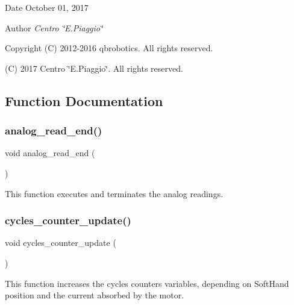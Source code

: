 \begin{DoxyDate}{Date}
October 01, 2017 
\end{DoxyDate}
\begin{DoxyAuthor}{Author}
{\itshape Centro \char`\"{}\+E.\+Piaggio\char`\"{}} 
\end{DoxyAuthor}
\begin{DoxyCopyright}{Copyright}
(C) 2012-\/2016 qbrobotics. All rights reserved. 

(C) 2017 Centro \char`\"{}\+E.\+Piaggio\char`\"{}. All rights reserved. 
\end{DoxyCopyright}


\subsection{Function Documentation}
\mbox{\label{interruptions_8c_a00a8d34962a63161405e5d7785b9625e}} 
\subsubsection{analog\+\_\+read\+\_\+end()}
{\footnotesize\ttfamily void analog\+\_\+read\+\_\+end (\begin{DoxyParamCaption}{ }\end{DoxyParamCaption})}

This function executes and terminates the analog readings. \mbox{\label{interruptions_8c_a77877c16b42f6f384f7c80d3002aed22}} 
\subsubsection{cycles\+\_\+counter\+\_\+update()}
{\footnotesize\ttfamily void cycles\+\_\+counter\+\_\+update (\begin{DoxyParamCaption}{ }\end{DoxyParamCaption})}

This function increases the cycles counters variables, depending on Soft\+Hand position and the current absorbed by the motor. \mbox{\label{interruptions_8c_af8d2e8be60bb142650c4fcf4b782fb14}} 
